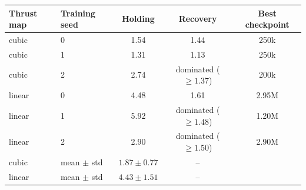 \begin{tabular}{llccc}
\toprule
Thrust map & Training seed & Holding & Recovery & Best checkpoint \\
\midrule
cubic & 0 & 1.54 & 1.44 & 250k \\
cubic & 1 & 1.31 & 1.13 & 250k \\
cubic & 2 & 2.74 & dominated ($\geq 1.37$) & 200k \\
\addlinespace
linear & 0 & 4.48 & 1.61 & 2.95M \\
linear & 1 & 5.92 & dominated ($\geq 1.48$) & 1.20M \\
linear & 2 & 2.90 & dominated ($\geq 1.50$) & 2.90M \\
\addlinespace
cubic & mean $\pm$ std & $1.87 \pm 0.77$ & -- & \\
linear & mean $\pm$ std & $4.43 \pm 1.51$ & -- & \\
\bottomrule
\end{tabular}
